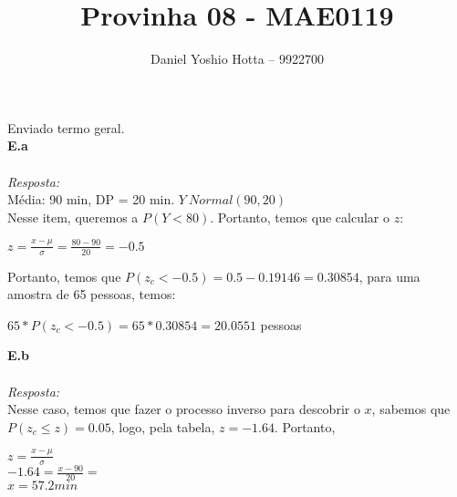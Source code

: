 \documentclass{article}
\begin{document}
	
	\title{Provinha 08 - MAE0119}
	\author{Daniel Yoshio Hotta – 9922700}
	
	\maketitle	
	
	Enviado termo geral.\\
	
	\textbf {E.a} 
	\\ \\
	\textit {Resposta:} \\
    
    Média: 90 min, DP = 20 min. $Y ~ Normal (90, 20)$\\
    
    Nesse item, queremos a $P(Y < 80)$. Portanto, temos que calcular o $z$:
    
    \begin{center}
    	$z = \frac{x - \mu}{\sigma} = \frac{80 - 90}{20} = -0.5$
    \end{center}
    
    Portanto, temos que $P (z_c < -0.5) = 0.5 - 0.19146 = 0.30854$, para uma amostra de 65 pessoas, temos: 
    
    \begin{center}
    	$65 * P (z_c < -0.5) = 65 * 0.30854 = 20.0551$ pessoas
    \end{center}
    
    \textbf {E.b} 
    \\ \\
    \textit {Resposta:} \\	
        
    Nesse caso, temos que fazer o processo inverso para descobrir o $x$, sabemos que $P(z_c \leq z) = 0.05$, logo, pela tabela, $z = -1.64$. Portanto,\\
    
    \begin{center}
    	$z = \frac{x - \mu}{\sigma}$\\
    	$-1.64 = \frac{x - 90}{20} = $\\
    	$x = 57.2 min$
    \end{center}
\end{document}
